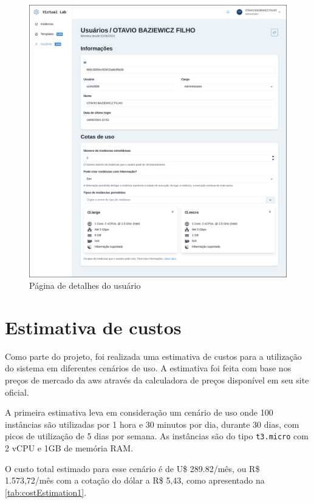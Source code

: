 \begin{figure}[H]
\caption{Página de detalhes do usuário}
\label{fig:userDetails}
\includegraphics[width=\textwidth]{capitulos/3-resultados/files/user-page.png}
\end{figure}

\section{Estimativa de custos}
\label{sec:estimativaDeCustos}

Como parte do projeto, foi realizada uma estimativa de custos para a utilização do sistema em diferentes cenários de uso. A estimativa foi feita com base nos preços de mercado da \gls{aws} através da calculadora de preços disponível em seu site oficial. 

A primeira estimativa leva em consideração um cenário de uso onde 100 instâncias são utilizadas por 1 hora e 30 minutos por dia, durante 30 dias, com picos de utilização de 5 dias por semana. As instâncias são do tipo \texttt{t3.micro} com 2 vCPU e 1GB de memória RAM.

O custo total estimado para esse cenário é de U\$ 289.82/mês, ou R\$ 1.573,72/mês com a cotação do dólar a R\$ 5,43, como apresentado na \autoref{tab:costEstimation1}.


